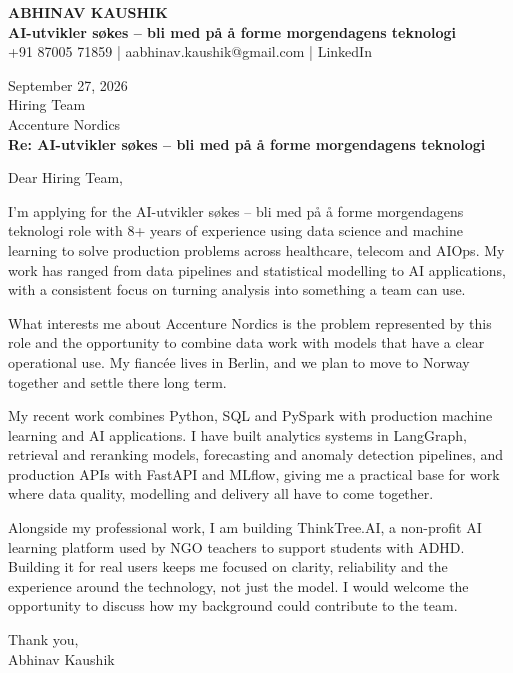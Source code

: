 \documentclass[10pt,a4paper]{article}
\begin{document}
\begin{center}
{\Large\bfseries ABHINAV KAUSHIK}\\[2pt]
{\bfseries AI-utvikler søkes – bli med på å forme morgendagens teknologi}\\[2pt]
+91 87005 71859 \quad | \quad aabhinav.kaushik@gmail.com \quad | \quad LinkedIn
\end{center}
\vspace{8pt}
September 27, 2026\\[6pt]
Hiring Team\\
Accenture Nordics\\[4pt]
\textbf{Re: AI-utvikler søkes – bli med på å forme morgendagens teknologi}

Dear Hiring Team,

I’m applying for the AI-utvikler søkes – bli med på å forme morgendagens teknologi role with 8+ years of experience using data science and machine learning to solve production problems across healthcare, telecom and AIOps. My work has ranged from data pipelines and statistical modelling to AI applications, with a consistent focus on turning analysis into something a team can use.

What interests me about Accenture Nordics is the problem represented by this role and the opportunity to combine data work with models that have a clear operational use. My fiancée lives in Berlin, and we plan to move to Norway together and settle there long term.

My recent work combines Python, SQL and PySpark with production machine learning and AI applications. I have built analytics systems in LangGraph, retrieval and reranking models, forecasting and anomaly detection pipelines, and production APIs with FastAPI and MLflow, giving me a practical base for work where data quality, modelling and delivery all have to come together.

Alongside my professional work, I am building ThinkTree.AI, a non-profit AI learning platform used by NGO teachers to support students with ADHD. Building it for real users keeps me focused on clarity, reliability and the experience around the technology, not just the model. I would welcome the opportunity to discuss how my background could contribute to the team.

Thank you,\\
Abhinav Kaushik
\end{document}
